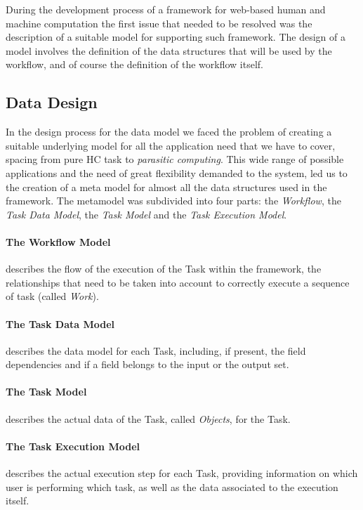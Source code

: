 During the development process of a framework for web-based human and machine
computation the first issue that needed to be
resolved was the description of a suitable model for supporting such framework.
The design of a model involves the definition of the data structures that will
be used by the workflow, and of course the definition of the workflow itself.

\subsection{Data Design}
In the design process for the data model we faced the problem of creating a
suitable underlying model for all the application need that we have to cover,
spacing from pure \acl{HC} task to \emph{parasitic computing}. This wide range
of possible applications and the need of great flexibility demanded to the system,
led us to the creation of a meta model for almost all the data structures used in
the framework. The metamodel was subdivided into four parts: the \emph{Workflow}, the
\emph{Task Data Model}, the \emph{Task Model} and the \emph{Task Execution Model}.

\paragraph{The Workflow Model} describes the flow of the execution of the Task
within the framework, the relationships that need to be taken into account to
correctly execute a sequence of task (called \emph{Work}).

\paragraph{The Task Data Model} describes the data model for each Task, including,
if present, the field dependencies and if a field belongs to the input or the
output set.

\paragraph{The Task Model} describes the actual data of the Task, called
\emph{Objects}, for the Task.

\paragraph{The Task Execution Model} describes the actual execution step for
each Task, providing information on which user is performing which task, as well
as the data associated to the execution itself.


